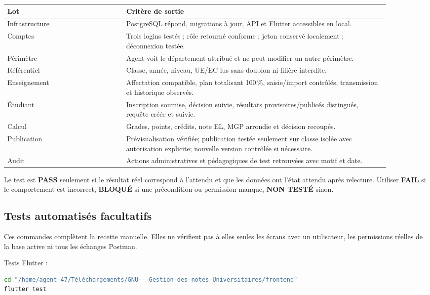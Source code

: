 \documentclass[10pt,a4paper]{article}
\begin{document}
\begin{longtable}{p{0.28\linewidth}p{0.62\linewidth}}
\toprule
Lot & Critère de sortie \\
\midrule
Infrastructure & PostgreSQL répond, migrations à jour, API et Flutter accessibles en local. \\
Comptes & Trois logins testés ; rôle retourné conforme ; jeton conservé localement ; déconnexion testée. \\
Périmètre & Agent voit le département attribué et ne peut modifier un autre périmètre. \\
Référentiel & Classe, année, niveau, UE/EC lus sans doublon ni filière interdite. \\
Enseignement & Affectation compatible, plan totalisant 100\,\%, saisie/import contrôlés, transmission et historique observés. \\
Étudiant & Inscription soumise, décision suivie, résultats provisoires/publicés distingués, requête créée et suivie. \\
Calcul & Grades, points, crédits, note EL, MGP arrondie et décision recoupés. \\
Publication & Prévisualisation vérifiée; publication testée seulement sur classe isolée avec autorisation explicite; nouvelle version contrôlée si nécessaire. \\
Audit & Actions administratives et pédagogiques de test retrouvées avec motif et date. \\
\bottomrule
\end{longtable}

Le test est \textbf{PASS} seulement si le résultat réel correspond à l’attendu et que les données ont l’état attendu après relecture. Utiliser \textbf{FAIL} si le comportement est incorrect, \textbf{BLOQUÉ} si une précondition ou permission manque, \textbf{NON TESTÉ} sinon.

\subsection{Tests automatisés facultatifs}

Ces commandes complètent la recette manuelle. Elles ne vérifient pas à elles seules les écrans avec un utilisateur, les permissions réelles de la base active ni tous les échanges Postman.

Tests Flutter :
\begin{lstlisting}[language=bash]
cd "/home/agent-47/Téléchargements/GNU---Gestion-des-notes-Universitaires/frontend"
flutter test
\end{lstlisting}
\end{document}
